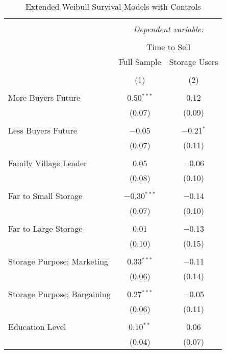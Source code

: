 
\begin{table}[!htbp] \centering 
  \caption{Extended Weibull Survival Models with Controls} 
  \label{tab: extended Survival AFT with controls} 
\footnotesize 
\begin{tabular}{@{\extracolsep{5pt}}lcc} 
\\[-1.8ex]\hline 
\hline \\[-1.8ex] 
 & \multicolumn{2}{c}{\textit{Dependent variable:}} \\ 
\cline{2-3} 
\\[-1.8ex] & \multicolumn{2}{c}{Time to Sell} \\ 
 & Full Sample & Storage Users \\ 
\\[-1.8ex] & (1) & (2)\\ 
\hline \\[-1.8ex] 
 More Buyers Future & 0.50$^{***}$ & 0.12 \\ 
  & (0.07) & (0.09) \\ 
  & & \\ 
 Less Buyers Future & $-$0.05 & $-$0.21$^{*}$ \\ 
  & (0.07) & (0.11) \\ 
  & & \\ 
 Family Village Leader & 0.05 & $-$0.06 \\ 
  & (0.08) & (0.10) \\ 
  & & \\ 
 Far to Small Storage & $-$0.30$^{***}$ & $-$0.14 \\ 
  & (0.07) & (0.10) \\ 
  & & \\ 
 Far to Large Storage & 0.01 & $-$0.13 \\ 
  & (0.10) & (0.15) \\ 
  & & \\ 
 Storage Purpose: Marketing & 0.33$^{***}$ & $-$0.11 \\ 
  & (0.06) & (0.14) \\ 
  & & \\ 
 Storage Purpose: Bargaining & 0.27$^{***}$ & $-$0.05 \\ 
  & (0.06) & (0.11) \\ 
  & & \\ 
 Education Level & 0.10$^{**}$ & 0.06 \\ 
  & (0.04) & (0.07) \\ 

\end{tabular}
\end{table}
